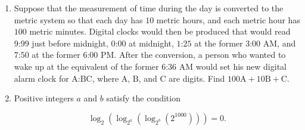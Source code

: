 \documentclass{article}
\begin{document}
\begin{enumerate}[label=\arabic*., itemsep=0.5em]\item Suppose that the measurement of time during the day is converted to the metric system so that each day has \(10\) metric hours, and each metric hour has \(100\) metric minutes. Digital clocks would then be produced that would read \(\text{9:99}\) just before midnight, \(\text{0:00}\) at midnight, \(\text{1:25}\) at the former \(\text{3:00}\) AM, and \(\text{7:50}\) at the former \(\text{6:00}\) PM. After the conversion, a person who wanted to wake up at the equivalent of the former \(\text{6:36}\) AM would set his new digital alarm clock for \(\text{A:BC}\), where \(\text{A}\), \(\text{B}\), and \(\text{C}\) are digits. Find \(100\text{A}+10\text{B}+\text{C}\).\par \vspace{0.5em}\item Positive integers \(a\) and \(b\) satisfy the condition

\begin{equation*}
\log_2(\log_{2^a}(\log_{2^b}(2^{1000}))) = 0.
\end{equation*}


\end{enumerate}
\end{document}
